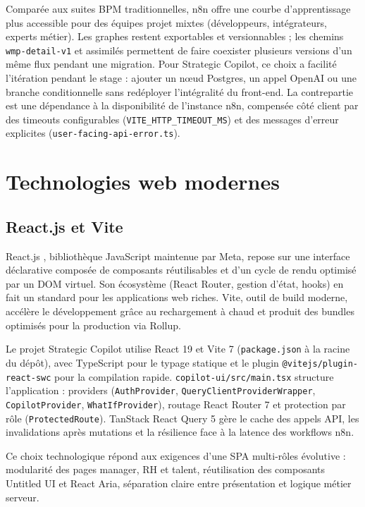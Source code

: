 Comparée aux suites BPM traditionnelles, n8n offre une courbe d'apprentissage plus accessible pour des équipes projet mixtes (développeurs, intégrateurs, experts métier). Les graphes restent exportables et versionnables ; les chemins \texttt{wmp-detail-v1} et assimilés permettent de faire coexister plusieurs versions d'un même flux pendant une migration. Pour Strategic Copilot, ce choix a facilité l'itération pendant le stage : ajouter un nœud Postgres, un appel OpenAI ou une branche conditionnelle sans redéployer l'intégralité du front-end. La contrepartie est une dépendance à la disponibilité de l'instance n8n, compensée côté client par des timeouts configurables (\texttt{VITE\_HTTP\_TIMEOUT\_MS}) et des messages d'erreur explicites (\texttt{user-facing-api-error.ts}).

\section{Technologies web modernes}

\subsection{React.js et Vite}

React.js \cite{react2024}, bibliothèque JavaScript maintenue par Meta, repose sur une interface déclarative composée de composants réutilisables et d'un cycle de rendu optimisé par un DOM virtuel. Son écosystème (React Router, gestion d'état, hooks) en fait un standard pour les applications web riches. Vite, outil de build moderne, accélère le développement grâce au rechargement à chaud et produit des bundles optimisés pour la production via Rollup.

Le projet Strategic Copilot utilise React 19 et Vite 7 \cite{react2024,vite2025,typescript2025} (\texttt{package.json} à la racine du dépôt), avec TypeScript pour le typage statique et le plugin \texttt{@vitejs/plugin-react-swc} pour la compilation rapide. \texttt{copilot-ui/src/main.tsx} structure l'application : providers (\texttt{AuthProvider}, \texttt{QueryClientProviderWrapper}, \texttt{CopilotProvider}, \texttt{WhatIfProvider}), routage React Router 7 et protection par rôle (\texttt{ProtectedRoute}). TanStack React Query 5 gère le cache des appels API, les invalidations après mutations et la résilience face à la latence des workflows n8n.

Ce choix technologique répond aux exigences d'une SPA multi-rôles évolutive : modularité des pages manager, RH et talent, réutilisation des composants Untitled UI et React Aria, séparation claire entre présentation et logique métier serveur.

